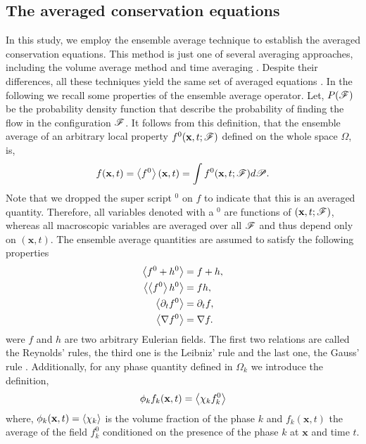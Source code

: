\subsection{The averaged conservation equations}
In this study, we employ the ensemble average technique to establish the averaged conservation equations. 
This method is just one of several averaging approaches, including the volume average method \citep{jackson1997locally} and time averaging \citep{ishii2010thermo}. 
Despite their differences, all these techniques yield the same set of averaged equations \citep{jackson1997locally,zhang1997momentum}.
In the following we recall some properties of the ensemble average operator. 
Let, $P(\mathscr{F})$ be the probability density function that describe the probability of finding the flow in the configuration $\mathscr{F}$. 
It follows from this definition, that the ensemble average of an arbitrary local property $f^0(\textbf{x},t;\mathscr{F})$ defined on the whole space $\Omega$, is,
\begin{equation}
    f(\textbf{x},t)
    = \left<f^0\right>(\textbf{x},t)
    =\int f^0(\textbf{x},t;\mathscr{F}) d\mathscr{P}. 
    \label{eq:avg}
\end{equation}  
Note that we dropped the super script $^0$ on $f$ to indicate that this is an averaged quantity. 
Therefore, all variables denoted with a $^0$ are functions of $(\textbf{x}, t; \mathscr{F})$, whereas all macroscopic variables are averaged over all $\mathscr{F}$ and thus depend only on $(\textbf{x}, t)$.
The ensemble average quantities are assumed to satisfy the following properties \citep{drew1983mathematical}
\begin{align}
    \left<f^0+h^0\right> &= f+h, \\ 
    \left<\left<f^0\right>h^0\right> &= fh, \\
    \left<\partial_t f^0\right> 
    &= \partial_t f, \\ 
    \left<\mathbf{\nabla} f^0\right>
    &= \mathbf{\nabla} f. 
    \label{eq:avg_properties}
\end{align}
were $f$ and $h$ are two arbitrary Eulerian fields. The first two relations are called the Reynolds' rules, the third one is the Leibniz' rule and the last one, the Gauss' rule \citep{drew1983mathematical}.
Additionally, for any phase quantity defined in $\Omega_k$ we introduce the definition, 
\begin{equation}
    \phi_k f_k (\textbf{x},t) = \left<\chi_k f_k^0\right>
    \label{eq:1_avg}
\end{equation}
where, $\phi_k(\textbf{x},t) = \left<\chi_k\right>$ is the volume fraction of the phase $k$
and $f_k(\textbf{x},t)$ the average of the field $f_k^0$ conditioned on the presence of the phase $k$ at $\textbf{x}$ and time $t$.
